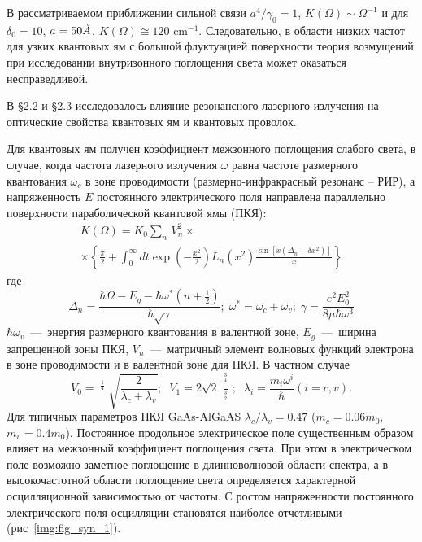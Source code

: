 В рассматриваемом приближении сильной связи $a^4 /\gamma_0 =1$, $K(\Omega )\sim \Omega ^{-1} $ и для $\delta_0 =10$, $a=50 \AA$, $K(\Omega )\cong 120 \text{ cm}^{-1} $. Следовательно, в области низких частот для узких квантовых ям с большой флуктуацией поверхности теория возмущений при исследовании внутризонного поглощения света может оказаться несправедливой.

В §2.2 и §2.3 исследовалось влияние резонансного лазерного излучения на оптические свойства квантовых ям и квантовых проволок.

Для квантовых ям получен коэффициент межзонного поглощения слабого света, в случае, когда частота лазерного излучения $\omega $ равна частоте размерного квантования $\omega_c $ в зоне проводимости (размерно-инфракрасный резонанс -- РИР), а напряженность $E$ постоянного электрического поля направлена параллельно поверхности параболической квантовой ямы (ПКЯ): 
\begin{multline} \label{eq:syn_11} 
K(\Omega )=K_0 \sum _{n} \, V_n^2 \times  \\
\times \left\{\frac{\pi }{2} +\int_0^{\infty } dt \exp \left(-\frac{x^2 }{2} \right)L_n \left(x^2 \right)\frac{\sin \left[x\left(\Delta_n -\delta x^2 \right)\right]}{x} \right\}
\end{multline} 
где 
\[
\Delta_n =\frac{\hbar \Omega -E_g -\hbar \omega^* \left(n+{\tfrac{1}{2}} \right)}{\hbar \sqrt{\gamma } } ; \; \omega^* =\omega_c +\omega_v ; \; \gamma =\frac{e^2 E_0^2 }{8 \mu \hbar \omega^3 }
\] 
$\hbar \omega_v $~---~энергия размерного квантования в валентной зоне, $E_g$~---~ширина запрещенной зоны ПКЯ, $V_n $~---~матричный элемент волновых функций электрона в зоне проводимости и в валентной зоне для ПКЯ. В частном случае 
\[V_0 =\mathop{\left(\lambda_c \lambda_v \right)}\nolimits^{{\tfrac{1}{4}} } \sqrt{\frac{2}{\lambda_c +\lambda_v } } ;\; \; V_1 =2\sqrt{2} \frac{\mathop{\left(\lambda_c \lambda_v \right)}\nolimits^{{\tfrac{3}{4}} } }{\mathop{\left(\lambda_c +\lambda_v \right)}\nolimits^{{\tfrac{3}{2}} } } ;\; \; \lambda_i =\frac{m_i \omega^i }{\hbar } (i=c,v).\] 
Для типичных параметров ПКЯ GaAs-AlGaAS $\lambda_c /\lambda_v =0.47$ ($m_c =0.06m_0 ,$ $m_v =0.4m_0 $). Постоянное продольное электрическое поле существенным образом влияет на межзонный коэффициент поглощения света. При этом в электрическом поле возможно заметное поглощение в длинноволновой области спектра, а в высокочастотной области поглощение света определяется характерной осцилляционной зависимостью от частоты. С ростом напряженности постоянного электрического поля осцилляции становятся наиболее отчетливыми (рис~\ref{img:fig_syn_1}).

